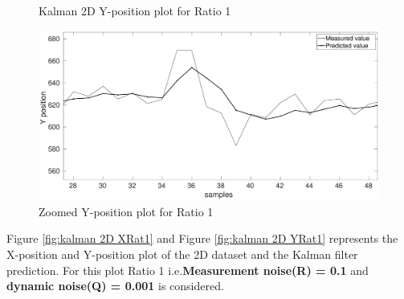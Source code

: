\documentclass[12pt]{article}
\begin{document}
\begin{figure}[h]
\begin{minipage}{0.5\textwidth}
	\caption{Kalman 2D Y-position plot for Ratio 1}
	\label{fig:kalman 2D YRat1}
\end{minipage}%
\begin{minipage}{0.5\textwidth}
\centering
	\includegraphics[width = \textwidth]{./Figures/part2Ratio1Yzoomed.eps}
	\caption{ Zoomed Y-position plot for Ratio 1}
	\label{fig: kalman 2D YRat1 zoom}
\end{minipage}
\end{figure}
\noindent
Figure \ref{fig:kalman 2D XRat1} and Figure \ref{fig:kalman 2D YRat1} represents the X-position and Y-position plot of the 2D dataset and the Kalman filter prediction. For this plot Ratio 1 i.e.\textbf{Measurement noise(R) = 0.1} and \textbf{dynamic noise(Q) = 0.001} is considered.\\
\newpage
\end{document}

